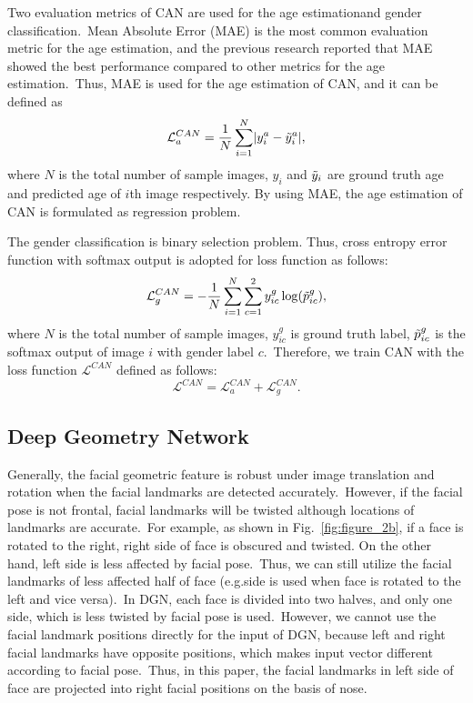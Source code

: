 \documentclass[10pt,twocolumn,letterpaper]{article}
\begin{document}
Two evaluation metrics of CAN are used for the age estimationand gender classification.~Mean Absolute Error (MAE) is the most common evaluation metric for the age estimation, and the previous research \cite{Xing2017} reported that MAE showed the best performance compared to other metrics for the age estimation.~Thus, MAE is used for the age estimation of CAN, and it can be defined as
\begin{equation}
\label{eq1}
\mathcal{L}_{a}^{CAN}=\frac{1}{N}\sum_{i=1}^N\lvert y_{i}^a-\Tilde{y}_{i}^a\rvert,
\end{equation}
where $N$ is the total number of sample images, $y_i$ and $\Tilde{y}_i$ are ground truth age and predicted age of $i$th image respectively. By using MAE, the age estimation of CAN is formulated as regression problem.

The gender classification is binary selection problem. Thus, cross entropy error function with softmax output is adopted for loss function as follows:
\begin{equation}
\label{eq2}
\mathcal{L}_{g}^{CAN}=-\frac{1}{N}\sum_{i=1}^N\sum_{c=1}^2y_{ic}^g\log(\Tilde{p}_{ic}^g),
\end{equation}
where  $N$ is the total number of sample images, $y^g_{ic}$ is ground truth label, $\Tilde{p}_{ic}^g$ is the softmax output of image $i$ with gender label $c$.~Therefore, we train CAN with the loss function $\mathcal{L}^{CAN}$ defined as follows:
\begin{equation}
\label{loss_CAN}
    \mathcal{L}^{CAN}=\mathcal{L}_a^{CAN}+\mathcal{L}_g^{CAN}.
\end{equation}


\subsection{Deep Geometry Network}
\label{section_DGN}
Generally, the facial geometric feature is robust under image translation and rotation when the facial landmarks are detected accurately.~However, if the facial pose is not frontal, facial landmarks will be twisted although locations of landmarks are accurate.~For example, as shown in Fig.~\ref{fig:figure_2b}, if a face is rotated to the right, right side of face is obscured and twisted. On the other hand, left side is less affected by facial pose.~Thus, we can still utilize the facial landmarks of less affected half of face (e.g.\right side is used when face is rotated to the left and vice versa).~In DGN, each face is divided into two halves, and only one side, which is less twisted by facial pose is used.~However, we cannot use the facial landmark positions directly for the input of DGN, because left and right facial landmarks have opposite positions, which makes input vector different according to facial pose.~Thus, in this paper, the facial landmarks in left side of face are projected into right facial positions on the basis of nose.
\end{document}
